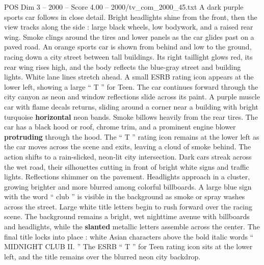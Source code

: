 \begin{textsample}{POS Dim 3 – 2000 – Score 4.00 – 2000/tv\_com\_2000\_45.txt}
A dark purple sports car follows in close detail.
Bright headlights shine from the front, then the view tracks along the side : large black wheels, low bodywork, and a raised rear wing.
Smoke clings around the tires and lower panels as the car glides past on a paved road.
An orange sports car is shown from behind and low to the ground, racing down a city street between tall buildings.
Its right taillight glows red, its rear wing rises high, and the body reflects the blue-gray street and building lights.
White lane lines stretch ahead.
A small ESRB rating icon appears at the lower left, showing a large “ T ” for Teen.
The car continues forward through the city canyon as neon and window reflections slide across its paint.
A purple muscle car with flame decals returns, sliding around a corner near a building with bright turquoise \textbf{horizontal} neon bands.
Smoke billows heavily from the rear tires.
The car has a black hood or roof, chrome trim, and a prominent engine blower \textbf{protruding} through the hood.
The “ T ” rating icon remains at the lower left as the car moves across the scene and exits, leaving a cloud of smoke behind.
The action shifts to a rain-slicked, neon-lit city intersection.
Dark cars streak across the wet road, their silhouettes cutting in front of bright white signs and traffic lights.
Reflections shimmer on the pavement.
Headlights approach in a cluster, growing brighter and more blurred among colorful billboards.
A large blue sign with the word “ club ” is visible in the background as smoke or spray washes across the street.
Large white title letters begin to rush forward over the racing scene.
The background remains a bright, wet nighttime avenue with billboards and headlights, while the \textbf{slanted} metallic letters assemble across the center.
The final title locks into place : white Asian characters above the bold italic words “ MIDNIGHT CLUB II. ” The ESRB “ T ” for Teen rating icon sits at the lower left, and the title remains over the blurred neon city backdrop.

\end{textsample}
